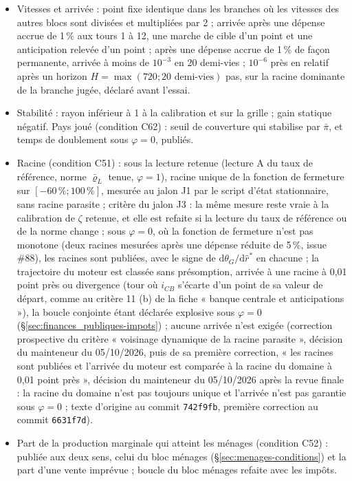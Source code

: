 \documentclass[11pt,a4paper]{article}
\begin{document}
\begin{proposee}
\begin{itemize}
\item Vitesses et arrivée : point fixe identique dans les branches où les vitesses des autres blocs sont divisées et multipliées par 2 ; arrivée après une dépense accrue de 1\,\% aux tours 1 à 12, une marche de cible d'un point et une anticipation relevée d'un point ; après une dépense accrue de 1\,\% de façon permanente, arrivée à moins de $10^{-3}$ en 20 demi-vies ; $10^{-6}$ près en relatif après un horizon $H = \max(720 ; \text{20 demi-vies})$ pas, sur la racine dominante de la branche jugée, déclaré avant l'essai.
\item Stabilité : rayon inférieur à 1 à la calibration et sur la grille ; gain statique négatif. Pays joué (condition C62) : seuil de couverture qui stabilise par $\bar\pi$, et temps de doublement sous $\varphi = 0$, publiés.
\item Racine (condition C51) : sous la lecture retenue (lecture A du taux de référence, norme $\bar\varrho_L$ tenue, $\varphi = 1$), racine unique de la fonction de fermeture sur $[-60\,\% ; 100\,\%]$, mesurée au jalon J1 par le script d'état stationnaire, sans racine parasite ; critère du jalon J3 : la même mesure reste vraie à la calibration de $\zeta$ retenue, et elle est refaite si la lecture du taux de référence ou de la norme change ; sous $\varphi = 0$, où la fonction de fermeture n'est pas monotone (deux racines mesurées après une dépense réduite de 5\,\%, issue \#88), les racines sont publiées, avec le signe de $\mathrm{d}\theta_G/\mathrm{d}\hat r^\ast$ en chacune ; la trajectoire du moteur est classée sans présomption, arrivée à une racine à 0,01 point près ou divergence (tour où $i_{\mathit{CB}}$ s'écarte d'un point de sa valeur de départ, comme au critère 11 (b) de la fiche « banque centrale et anticipations »), la boucle conjointe étant déclarée explosive sous $\varphi = 0$ (\S\ref{sec:finances_publiques-impots}) ; aucune arrivée n'est exigée (correction prospective du critère « voisinage dynamique de la racine parasite », décision du mainteneur du 05/10/2026, puis de sa première correction, « les racines sont publiées et l'arrivée du moteur est comparée à la racine du domaine à 0,01 point près », décision du mainteneur du 05/10/2026 après la revue finale : la racine du domaine n'est pas toujours unique et l'arrivée n'est pas garantie sous $\varphi = 0$ ; texte d'origine au commit \texttt{742f9fb}, première correction au commit \texttt{6631f7d}).
\item Part de la production marginale qui atteint les ménages (condition C52) : publiée aux deux sens, celui du bloc ménages (\S\ref{sec:menages-conditions}) et la part d'une vente imprévue ; boucle du bloc ménages refaite avec les impôts.

\end{itemize}
\end{proposee}
\end{document}
